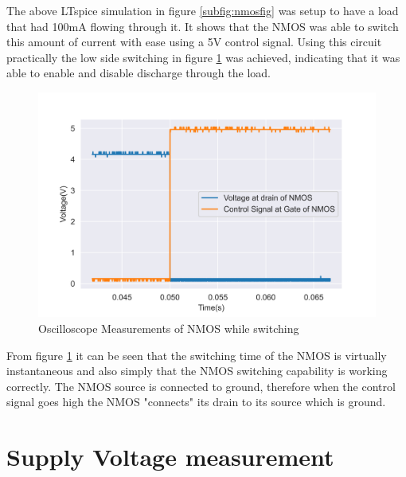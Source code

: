  The above LTspice simulation in figure \ref{subfig:nmosfig} was setup to have a load that had 100mA flowing through it. It shows that the NMOS was able to switch this amount of current with ease using a 5V control signal. Using this circuit practically the low side switching in figure \ref{fig:measNMOS} was achieved, indicating that it was able to enable and disable discharge through the load.


\begin{figure}[!htb]
\centering
\includegraphics[scale=0.6]{./Figures/NMOSmeas}
\caption{Oscilloscope Measurements of NMOS while switching}
\label{fig:measNMOS}
\end{figure}

From figure \ref{fig:measNMOS} it can be seen that the switching time of the NMOS is virtually instantaneous and also simply that the NMOS switching capability is working correctly. The NMOS source is connected to ground, therefore when the control signal goes high the NMOS "connects" its drain to its source which is ground.

\newpage
\section{Supply Voltage measurement}


